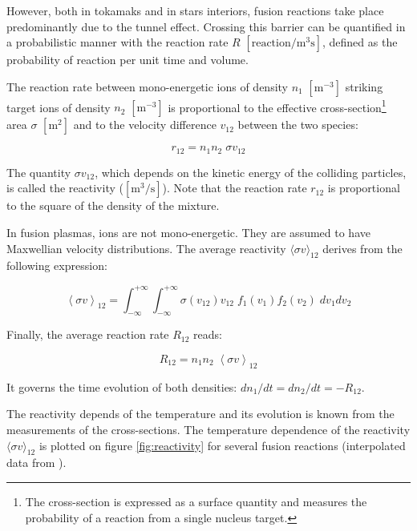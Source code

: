 However, both in tokamaks and in stars interiors, fusion reactions take place predominantly due to the tunnel effect. Crossing this barrier can be quantified in a probabilistic manner with the reaction rate $R$ $[\mathrm{reaction/m^3 s}]$, defined as the probability of reaction per unit time and volume. 

The reaction rate between mono-energetic ions of density $n_1$ $\mathrm{[m^{-3}]}$ striking target ions of density $n_2$ $\mathrm{[m^{-3}]}$ is proportional to the effective cross-section\footnote{The cross-section is expressed as a surface quantity and measures the probability of a reaction from a single nucleus target.} area $\sigma$ $\mathrm{[m^2]}$ and to the velocity difference $v_{12}$ between the two species:

\begin{equation*}
r_{12} = n_1 n_2 \; \sigma v_{12}
\end{equation*}

The quantity $\sigma v_{12}$, which depends on the kinetic energy of the colliding particles, is called the reactivity ($\mathrm{[m^3/s]}$). Note that the reaction rate $r_{12}$ is proportional to the square of the density of the mixture. 

In fusion plasmas, ions are not mono-energetic. They are assumed to have Maxwellian velocity distributions. The average reactivity $\langle \sigma v \rangle_{12}$ derives from the following expression:

\begin{equation*}
\left < \sigma v \right >_{12} 
= \int_{-\infty}^{+\infty} \int_{-\infty}^{+\infty} 
\sigma(v_{12}) v_{12}\;  f_1(v_1) f_2(v_2) \; dv_1dv_2
\end{equation*}

Finally, the average reaction rate $R_{12}$ reads:

\begin{equation*}
R_{12} = n_1 n_2 \; \left < \sigma v \right >_{12}
\end{equation*}

It governs the time evolution of both densities: $dn_1/dt = dn_2/dt = -R_{12}$.


The reactivity depends of the temperature and its evolution is known from the measurements of the cross-sections. The temperature dependence of the reactivity $\langle \sigma v \rangle_{12}$ is plotted on figure \ref{fig:reactivity} for several fusion reactions (interpolated data from \cite{Huba2013}). 

